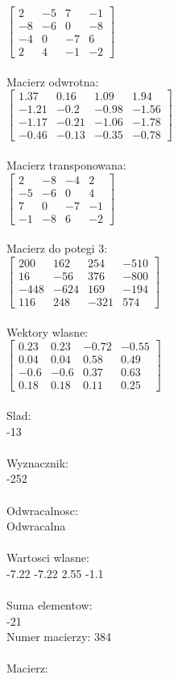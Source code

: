 \documentclass[a4paper,12pt]{article}
\begin{document}
$\begin{bmatrix} 2&-5&7&-1\\-8&-6&0&-8\\-4&0&-7&6\\2&4&-1&-2 \end{bmatrix}$
\\
\\
Macierz odwrotna:\\

$\begin{bmatrix} 1.37&0.16&1.09&1.94\\-1.21&-0.2&-0.98&-1.56\\-1.17&-0.21&-1.06&-1.78\\-0.46&-0.13&-0.35&-0.78 \end{bmatrix}$
\\
\\
Macierz transponowana:\\

$\begin{bmatrix} 2&-8&-4&2\\-5&-6&0&4\\7&0&-7&-1\\-1&-8&6&-2 \end{bmatrix}$
\\
\\
Macierz do potegi 3:\\

$\begin{bmatrix} 200&162&254&-510\\16&-56&376&-800\\-448&-624&169&-194\\116&248&-321&574 \end{bmatrix}$
\\
\\
Wektory wlasne:\\

$\begin{bmatrix} 0.23&0.23&-0.72&-0.55\\0.04&0.04&0.58&0.49\\-0.6&-0.6&0.37&0.63\\0.18&0.18&0.11&0.25 \end{bmatrix}$
\\
\\
Slad:\\
-13
\\
\\
Wyznacznik:\\
-252
\\
\\
Odwracalnosc:\\
Odwracalna
\\
\\
Wartosci wlasne:\\
-7.22 -7.22 2.55 -1.1
\\
\\
Suma elementow:\\
-21
\\
\newpage
Numer macierzy:
384
\\
\\
Macierz:\\
\end{document}
